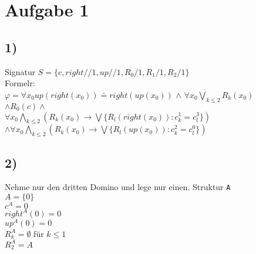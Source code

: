 \section*{Aufgabe 1}

\subsection*{1)}
Signatur $S=\{c, right//1, up//1, R_0/1, R_1/1, R_2/1 \}$\\
Formelr:\\


$\varphi =\forall x_0 up(right(x_0)) \doteq right(up(x_0))$
$\wedge$ 
$ \forall x_0 \dot{\bigvee}_{k\leq 2} R_k(x_0)$ \\
$\wedge  R_0(c)  \wedge$\\
$ \forall x_0 \bigwedge_{k \leq 2} (R_k (x_0) \rightarrow \bigvee \{ R_l(right(x_0)): c_{k}^{1} = c_{l}^{3} \} ) $\\
$\wedge \forall x_0 \bigwedge_{k \leq 2} (R_k (x_0) \rightarrow \bigvee \{ R_l(up(x_0)): c_{k}^{2} = c_{l}^{0} \} ) $ 

\subsection*{2)}
Nehme nur den dritten Domino und lege nur einen. Struktur \texttt{A}\\
$A = \{0\}$\\
$c^A =  0$\\
$right^A(0)=0$\\
$up^A(0)=0$\\
$R_k^A = \emptyset$ für $k\leq 1$\\
$R_2^A = A$ 